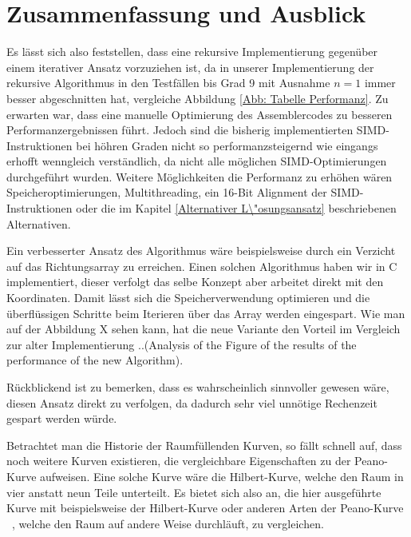 \documentclass[course=asp]{aspdoc}
\begin{document}
\section{Zusammenfassung und Ausblick} \label{Zusammenfassung und Ausblick}
Es l\"asst sich also feststellen, dass eine rekursive Implementierung gegen\"uber einem iterativer Ansatz vorzuziehen ist, da in unserer Implementierung der rekursive Algorithmus in den Testf\"allen bis Grad 9 mit Ausnahme $n = 1$ immer besser abgeschnitten hat, vergleiche Abbildung \ref{Abb: Tabelle Performanz}. Zu erwarten war, dass eine manuelle Optimierung des Assemblercodes zu besseren Performanzergebnissen f\"uhrt. Jedoch sind die bisherig implementierten SIMD-Instruktionen bei h\"ohren Graden nicht so performanzsteigernd wie eingangs erhofft wenngleich verst\"andlich, da nicht alle m\"oglichen SIMD-Optimierungen durchgef\"uhrt wurden. Weitere M\"oglichkeiten die Performanz zu erh\"ohen w\"aren Speicheroptimierungen, Multithreading, ein 16-Bit Alignment der SIMD-Instruktionen oder die im Kapitel \ref{Alternativer L\"osungsansatz} beschriebenen Alternativen.

Ein verbesserter Ansatz des Algorithmus w\"are beispielsweise durch ein Verzicht auf das Richtungsarray zu erreichen. Einen solchen Algorithmus haben wir in C implementiert, dieser verfolgt das selbe Konzept aber arbeitet direkt mit den Koordinaten. Damit l\"asst sich die Speicherverwendung optimieren und die \"uberfl\"ussigen Schritte beim Iterieren \"uber das Array werden eingespart. Wie man auf der Abbildung X sehen kann, hat die neue Variante den Vorteil im Vergleich zur alter Implementierung ..(Analysis of the Figure of the results of the performance of the new Algorithm).

R\"uckblickend ist zu bemerken, dass es wahrscheinlich sinnvoller gewesen w\"are, diesen Ansatz direkt zu verfolgen, da dadurch sehr viel unn\"otige Rechenzeit gespart werden w\"urde.

Betrachtet man die Historie der Raumf\"ullenden Kurven, so f\"allt schnell auf, dass noch weitere Kurven existieren, die vergleichbare Eigenschaften zu der Peano-Kurve aufweisen. Eine solche Kurve w\"are die Hilbert-Kurve, welche den Raum in vier anstatt neun Teile unterteilt. Es bietet sich also an, die hier ausgef\"uhrte Kurve mit beispielsweise der Hilbert-Kurve oder anderen Arten der Peano-Kurve ~\cite{raumKurven}, welche den Raum auf andere Weise durchl\"auft, zu vergleichen.


\newpage

{}
\end{document}
